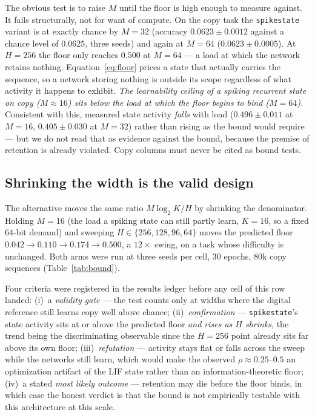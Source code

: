 The obvious test is to raise $M$ until the floor is high enough to measure against. It fails
structurally, not for want of compute. On the copy task the \texttt{spikestate} variant is at
exactly chance by $M{=}32$ (accuracy $0.0623 \pm 0.0012$ against a chance level of $0.0625$,
three seeds) and again at $M{=}64$ ($0.0623 \pm 0.0005$). At $H{=}256$ the floor only reaches
$0.500$ at $M{=}64$ --- a load at which the network retains nothing. Equation~\eqref{eq:floor}
prices a state that actually carries the sequence, so a network storing nothing is outside its
scope regardless of what activity it happens to exhibit. \emph{The learnability ceiling of a
spiking recurrent state on copy ($M \approx 16$) sits below the load at which the floor begins
to bind ($M{=}64$).} Consistent with this, measured state activity \emph{falls} with load
($0.496 \pm 0.011$ at $M{=}16$, $0.405 \pm 0.030$ at $M{=}32$) rather than rising as the
bound would require --- but we do not read that as evidence against the bound, because the
premise of retention is already violated. Copy columns must never be cited as bound tests.

\subsection{Shrinking the width is the valid design}
\label{sec:bound-H}

The alternative moves the same ratio $M\log_2 K / H$ by shrinking the denominator. Holding
$M{=}16$ (the load a spiking state can still partly learn, $K{=}16$, so a fixed $64$-bit
demand) and sweeping $H \in \{256, 128, 96, 64\}$ moves the predicted floor
$0.042 \to 0.110 \to 0.174 \to 0.500$, a $12\times$ swing, on a task whose difficulty is
unchanged. Both arms were run at three seeds per cell, $30$ epochs, $80$k copy sequences
(Table~\ref{tab:bound}).

Four criteria were registered in the results ledger before any cell of this row landed:
(i)~a \emph{validity gate} --- the test counts only at widths where the digital reference
still learns copy well above chance; (ii)~\emph{confirmation} --- \texttt{spikestate}'s state
activity sits at or above the predicted floor \emph{and rises as $H$ shrinks}, the trend
being the discriminating observable since the $H{=}256$ point already sits far above its own
floor; (iii)~\emph{refutation} --- activity stays flat or falls across the sweep while the
networks still learn, which would make the observed $\rho \approx 0.25$--$0.5$ an
optimization artifact of the LIF state rather than an information-theoretic floor;
(iv)~a stated \emph{most likely outcome} --- retention may die before the floor binds, in
which case the honest verdict is that the bound is not empirically testable with this
architecture at this scale.

